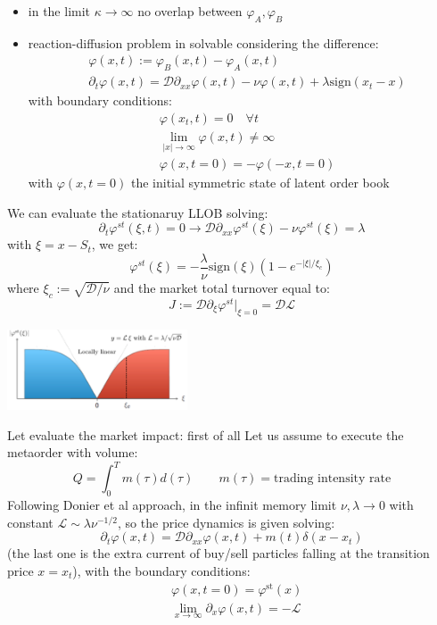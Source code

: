 \begin{itemize}
	\item in the limit $\kappa \to \infty$ no overlap between $\varphi_A, \varphi_B$
	\item reaction-diffusion problem in solvable considering the difference:
	\begin{align*}
		&\varphi(x,t):= \varphi_B(x,t) - \varphi_A(x,t)\\
		&\partial_t \varphi(x,t) = \mathcal{D}\partial_{xx} \varphi(x,t) - \nu \varphi(x,t) + \lambda \text{sign}(x_t-x)
	\end{align*}
with boundary conditions:
\begin{align*}
	&\varphi(x_t,t) = 0 \quad \forall t\\
	&\lim_{|x| \to \infty} \varphi(x,t) \neq \infty\\
	&\varphi(x, t=0) = -\varphi(-x, t = 0)
\end{align*}
with $\varphi(x, t=0)$ the initial symmetric state of latent order book
\end{itemize}
We can evaluate the stationaruy LLOB solving:
\[
\partial_t \varphi^{st}(\xi,t) = 0 \rightarrow \mathcal{D}\partial_{xx} \varphi^{st}(\xi) - \nu \varphi^{st}(\xi) = \lambda
\]
with $\xi = x - S_t$, we get:
\[
\varphi^{st}(\xi) = -\frac{\lambda}{\nu} \text{sign}(\xi)(1- e^{-|\xi|/\xi_c})
\]
where $\xi_c := \sqrt{\mathcal{D}/\nu}$ and the market total turnover equal to:
\[
J:= \mathcal{D}\partial_\xi \varphi^{st}|_{\xi = 0} = \mathcal{D}\mathcal{L}
\]
\begin{center}
\includegraphics[width=0.4\textwidth]{picture/(34)stationary_llob.png}
\end{center}
Let evaluate the market impact: first of all Let us assume to execute the metaorder with volume:
\[
Q =\int_0^T m(\tau)d(\tau) \qquad m(\tau) = \text{trading intensity rate} 
\]
Following Donier et al approach, in the infinit memory limit $\nu,\lambda \to 0$ with constant $\mathcal{L} \sim \lambda \nu^{-1/2}$, so the price dynamics is given solving:
\[
\partial_t \varphi(x,t) = \mathcal{D}\partial_{xx} \varphi(x,t) + m(t)\delta(x-x_t)
\]
(the last one is the extra current of buy/sell particles falling at the transition price $x =x_t$), with the boundary conditions:
\begin{align*}
	&\varphi(x,t = 0) = \varphi^{\text{st}}(x)\\
	&\lim_{x \to \infty} \partial_x \varphi(x,t) = -\mathcal{L}
\end{align*}
